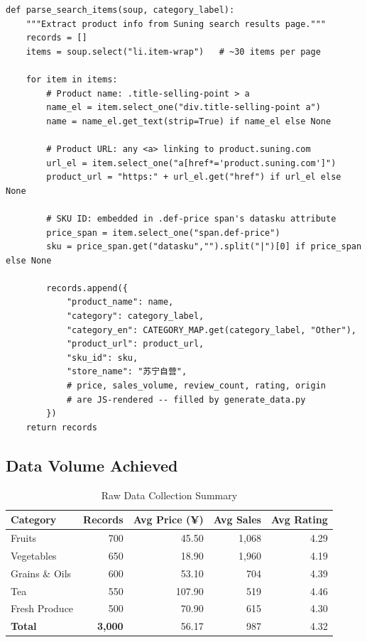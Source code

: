 \documentclass[12pt,a4paper]{report}
\begin{document}
\begin{lstlisting}[caption={Core product extraction from Suning search results}, label=lst:scraper]
def parse_search_items(soup, category_label):
    """Extract product info from Suning search results page."""
    records = []
    items = soup.select("li.item-wrap")   # ~30 items per page

    for item in items:
        # Product name: .title-selling-point > a
        name_el = item.select_one("div.title-selling-point a")
        name = name_el.get_text(strip=True) if name_el else None

        # Product URL: any <a> linking to product.suning.com
        url_el = item.select_one("a[href*='product.suning.com']")
        product_url = "https:" + url_el.get("href") if url_el else None

        # SKU ID: embedded in .def-price span's datasku attribute
        price_span = item.select_one("span.def-price")
        sku = price_span.get("datasku","").split("|")[0] if price_span else None

        records.append({
            "product_name": name,
            "category": category_label,
            "category_en": CATEGORY_MAP.get(category_label, "Other"),
            "product_url": product_url,
            "sku_id": sku,
            "store_name": "苏宁自营",
            # price, sales_volume, review_count, rating, origin
            # are JS-rendered -- filled by generate_data.py
        })
    return records
\end{lstlisting}

\subsection{Data Volume Achieved}

\begin{table}[H]
  \centering
  \caption{Raw Data Collection Summary}
  \begin{tabular}{@{}lrrrr@{}}
    \toprule
    \textbf{Category} & \textbf{Records} & \textbf{Avg Price (¥)} & \textbf{Avg Sales} & \textbf{Avg Rating} \\
    \midrule
    Fruits           & 700 & 45.50  & 1,068 & 4.29 \\
    Vegetables       & 650 & 18.90  & 1,960 & 4.19 \\
    Grains \& Oils  & 600 & 53.10  & 704   & 4.39 \\
    Tea              & 550 & 107.90 & 519   & 4.46 \\
    Fresh Produce    & 500 & 70.90  & 615   & 4.30 \\
    \midrule
    \textbf{Total}   & \textbf{3,000} & 56.17 & 987 & 4.32 \\
    \bottomrule
  \end{tabular}
\end{table}
\end{document}
